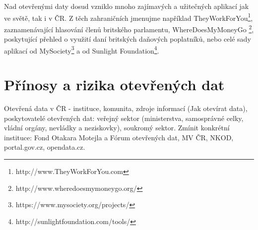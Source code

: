 Nad otevřenými daty dosud vzniklo mnoho zajímavých a užitečných aplikací jak ve světě, tak i v ČR. Z těch zahraničních jmenujme například TheyWorkForYou\footnote{http://www.TheyWorkForYou.com}, zaznamenávající hlasování členů britského parlamentu, WhereDoesMyMoneyGo \footnote{http://www.wheredoesmymoneygo.org/}, poskytující přehled o využití daní britských daňových poplatníků, nebo celé sady aplikací od MySociety\footnote{https://www.mysociety.org/projects/} a od Sunlight Foundation\footnote{http://sunlightfoundation.com/tools/}.


\section{Přínosy a rizika otevřených dat}

Otevřená data v ČR - instituce, komunita, zdroje informací (Jak otevírat data), poskytovatelé otevřených dat: veřejný sektor (ministerstva, samosprávné celky, vládní orgány, nevládky a neziskovky), soukromý sektor.
Zmínit konkrétní instituce: Fond Otakara Motejla a Fórum otevřených dat, MV ČR, NKOD, portal.gov.cz, opendata.cz.